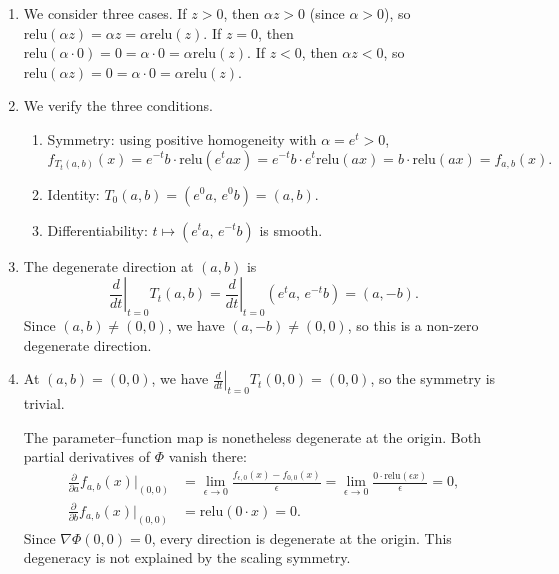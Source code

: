 \documentclass[11pt]{article}
\newcommand{\relu}{\mathrm{relu}}
\begin{document}
\begin{solution}
\begin{enumerate}
    \item We consider three cases. If $z > 0$, then $\alpha z > 0$ (since $\alpha > 0$), so $\relu(\alpha z) = \alpha z = \alpha \relu(z)$. If $z = 0$, then $\relu(\alpha \cdot 0) = 0 = \alpha \cdot 0 = \alpha \relu(z)$. If $z < 0$, then $\alpha z < 0$, so $\relu(\alpha z) = 0 = \alpha \cdot 0 = \alpha \relu(z)$.

    \item We verify the three conditions.
    \begin{enumerate}[label=(\roman*)]
        \item Symmetry: using positive homogeneity with $\alpha = e^t > 0$,
        \begin{equation*}
            f_{T_t(a,b)}(x)
            = e^{-t}b \cdot \relu(e^t a x)
            = e^{-t}b \cdot e^t \relu(ax)
            = b \cdot \relu(ax)
            = f_{a,b}(x).
        \end{equation*}
        \item Identity: $T_0(a, b) = (e^0 a,\, e^0 b) = (a, b)$.
        \item Differentiability: $t \mapsto (e^t a,\, e^{-t} b)$ is smooth.
    \end{enumerate}

    \item The degenerate direction at $(a, b)$ is
    \begin{equation*}
        \left.\frac{d}{dt}\right|_{t=0} T_t(a, b)
        = \left.\frac{d}{dt}\right|_{t=0} (e^t a,\, e^{-t} b)
        = (a, -b).
    \end{equation*}
    Since $(a, b) \neq (0, 0)$, we have $(a, -b) \neq (0, 0)$, so this is a non-zero degenerate direction.

    \item At $(a, b) = (0, 0)$, we have $\left.\frac{d}{dt}\right|_{t=0} T_t(0, 0) = (0, 0)$, so the symmetry is trivial.

    The parameter--function map is nonetheless degenerate at the origin. Both partial derivatives of $\Phi$ vanish there:
    \begin{align*}
        \frac{\partial}{\partial a} f_{a,b}(x) \bigg|_{(0,0)}
        &= \lim_{\epsilon \to 0}
            \frac{f_{\epsilon, 0}(x) - f_{0,0}(x)}{\epsilon}
        = \lim_{\epsilon \to 0}
            \frac{0 \cdot \relu(\epsilon x)}{\epsilon}
        = 0,
    \\
        \frac{\partial}{\partial b} f_{a,b}(x) \bigg|_{(0,0)}
        &= \relu(0 \cdot x) = 0.
    \end{align*}
    Since $\nabla \Phi(0,0) = 0$, every direction is degenerate at
    the origin. This degeneracy is not explained by the scaling symmetry.
    \qedhere
\end{enumerate}
\end{solution}
\end{document}
